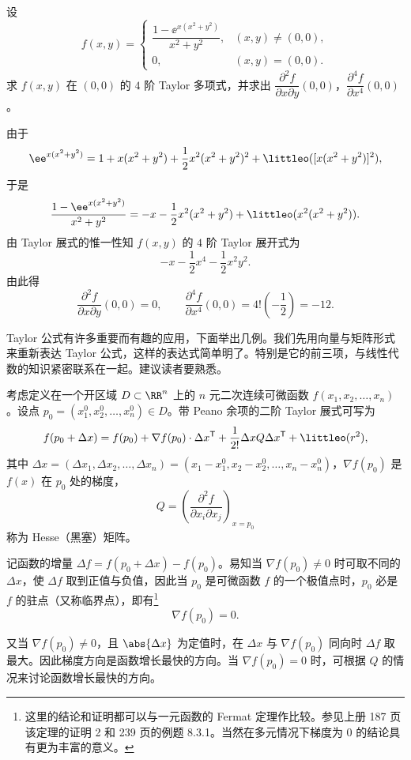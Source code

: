 \begin{xexample}[21.3.1]
设
\[
  f(x,y)=\begin{cases}
    \dfrac{1-\ee^{x(x^2+y^2)}}{x^2+y^2},&(x,y)\ne(0,0),\\[6pt]
    0,&(x,y)=(0,0).
  \end{cases}
\]
求 $f(x,y)$ 在 $(0,0)$ 的 $4$ 阶 Taylor 多项式，并求出 $\dfrac{\partial^2f}{\partial x\partial y}(0,0)$，$\dfrac{\partial^4f}{\partial x^4}(0,0)$。
\end{xexample}
\begin{xsolution}
由于
\[
  \ee^{x(x^2+y^2)}=1+x(x^2+y^2)+\frac12x^2(x^2+y^2)^2
  +\littleo([x(x^2+y^2)]^2),
\]
于是
\[
  \frac{1-\ee^{x(x^2+y^2)}}{x^2+y^2}
  =-x-\frac12x^2(x^2+y^2)+\littleo(x^2(x^2+y^2)).
\]
由 Taylor 展式的惟一性知 $f(x,y)$ 的 $4$ 阶 Taylor 展开式为
\[
  -x-\frac12x^4-\frac12x^2y^2.
\]
由此得
\[
  \frac{\partial^2f}{\partial x\partial y}(0,0)=0,
  \qquad
  \frac{\partial^4f}{\partial x^4}(0,0)=4!\left(-\frac12\right)=-12.
\]
\end{xsolution}

Taylor 公式有许多重要而有趣的应用，下面举出几例。我们先用向量与矩阵形式来重新表达 Taylor 公式，这样的表达式简单明了。特别是它的前三项，与线性代数的知识紧密联系在一起。建议读者要熟悉。

考虑定义在一个开区域 $D\subset\RR^n$ 上的 $n$ 元二次连续可微函数 $f(x_1,x_2,\ldots,x_n)$。设点 $p_0=(x_1^0,x_2^0,\ldots,x_n^0)\in D$。带 Peano 余项的二阶 Taylor 展式可写为
\[
  f(p_0+\Delta x)=f(p_0)+\nabla f(p_0)\cdot\Delta x^{\mathsf T}
  +\frac1{2!}\Delta xQ\Delta x^{\mathsf T}+\littleo(r^2),
\]
其中 $\Delta x=(\Delta x_1,\Delta x_2,\ldots,\Delta x_n)=(x_1-x_1^0,x_2-x_2^0,\ldots,x_n-x_n^0)$，$\nabla f(p_0)$ 是 $f(x)$ 在 $p_0$ 处的梯度，
\[
  Q=\left(\frac{\partial^2f}{\partial x_i\partial x_j}\right)_{x=p_0}
\]
称为 Hesse（黑塞）矩阵。

记函数的增量 $\Delta f=f(p_0+\Delta x)-f(p_0)$。易知当 $\nabla f(p_0)\ne0$ 时可取不同的 $\Delta x$，使 $\Delta f$ 取到正值与负值，因此当 $p_0$ 是可微函数 $f$ 的一个极值点时，$p_0$ 必是 $f$ 的驻点（又称临界点），即有\footnote{这里的结论和证明都可以与一元函数的 Fermat 定理作比较。参见上册 187 页该定理的证明 2 和 239 页的例题 8.3.1。当然在多元情况下梯度为 $0$ 的结论具有更为丰富的意义。}
\[
  \nabla f(p_0)=0.
\]

又当 $\nabla f(p_0)\ne0$，且 $\abs{\Delta x}$ 为定值时，在 $\Delta x$ 与 $\nabla f(p_0)$ 同向时 $\Delta f$ 取最大。因此梯度方向是函数增长最快的方向。当 $\nabla f(p_0)=0$ 时，可根据 $Q$ 的情况来讨论函数增长最快的方向。

